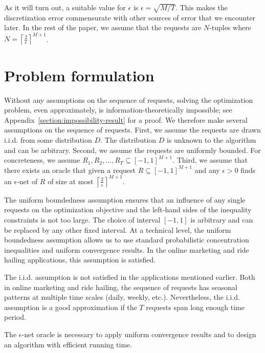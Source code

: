 \documentclass[12pt]{article}
\theoremstyle{definition}
\begin{document}
As it will turn out, a suitable value for $\epsilon$ is $\epsilon = \sqrt{M/T}$.
This makes the discretization error commensurate with other sources of error
that we encounter later. In the rest of the paper, we assume that the requests
are $N$-tuples where $N = \left\lceil \frac{2}{\epsilon}
\right\rceil^{M+1}$.

\section{Problem formulation}

Without any assumptions on the sequence of requests, solving the optimization
problem, even approximately, is information-theoretically impossible; see
Appendix~\ref{section:impossibility-result} for a proof. We therefore make
several assumptions on the sequence of requests. First, we assume the requests
are drawn i.i.d. from some distribution $D$. The distribution $D$ is unknown to
the algorithm and can be arbitrary. Second, we assume the requests are uniformly
bounded. For concreteness, we assume $R_1, R_2, \dots, R_T \subseteq [-1,
1]^{M+1}$. Third, we assume that there exists an oracle that given a request $R
\subseteq [-1,1]^{M+1}$ and any $\epsilon > 0$ finds an $\epsilon$-net of $R$ of
size at most $\left\lceil \frac{2}{\epsilon} \right\rceil^{M+1}$.

The uniform boundedness assumption ensures that an influence of any single
requests on the optimization objective and the left-hand sides of the inequality
constraints is not too large. The choice of interval $[-1,1]$ is arbitrary and
can be replaced by any other fixed interval. At a technical level, the uniform
boundedness assumption allows us to use standard probabilistic concentration
inequalities and uniform convergence results. In the online marketing and ride
hailing applications, this assumption is satisfied.

The i.i.d. assumption is not satisfied in the applications mentioned earlier.
Both in online marketing and ride hailing, the sequence of requests has seasonal
patterns at multiple time scales (daily, weekly, etc.). Nevertheless, the i.i.d.
assumption is a good approximation if the $T$ requests span long enough time
period.

The $\epsilon$-net oracle is necessary to apply uniform convergence results and
to design an algorithm with efficient running time.
\end{document}
